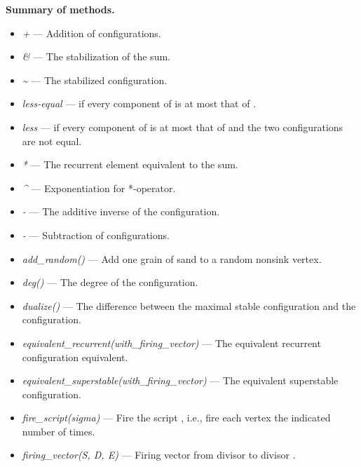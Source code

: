 \documentclass[letterpaper,10pt,english]{manual}
\begin{document}
\textbf{Summary of methods.}
\begin{itemize}
\item {} 
\emph{+} --- Addition of configurations.

\item {} 
\emph{\&} --- The stabilization of the sum.

\item {} 
\emph{\textasciitilde{}} --- The stabilized configuration.

\item {} 
\emph{less-equal} ---  if every component of  is at most that of .

\item {} 
\emph{less} ---  if every component of  is at most that of  and the two configurations are not equal.

\item {} 
\emph{*} --- The recurrent element equivalent to the sum.

\item {} 
\emph{\textasciicircum{}} --- Exponentiation for *-operator.

\item {} 
\emph{-} --- The additive inverse of the configuration.

\item {} 
\emph{-} --- Subtraction of configurations.

\item {} 
\emph{add\_random()} --- Add one grain of sand to a random nonsink vertex.

\item {} 
\emph{deg()} --- The degree of the configuration.

\item {} 
\emph{dualize()} --- The difference between the maximal stable configuration and the configuration.

\item {} 
\emph{equivalent\_recurrent(with\_firing\_vector)} --- The equivalent recurrent configuration equivalent.

\item {} 
\emph{equivalent\_superstable(with\_firing\_vector)} --- The equivalent superstable configuration.

\item {} 
\emph{fire\_script(sigma)} --- Fire the script , i.e., fire each vertex the indicated number of times.

\item {} 
\emph{firing\_vector(S, D, E)} --- Firing vector from
divisor  to divisor .


\end{itemize}
\end{document}
